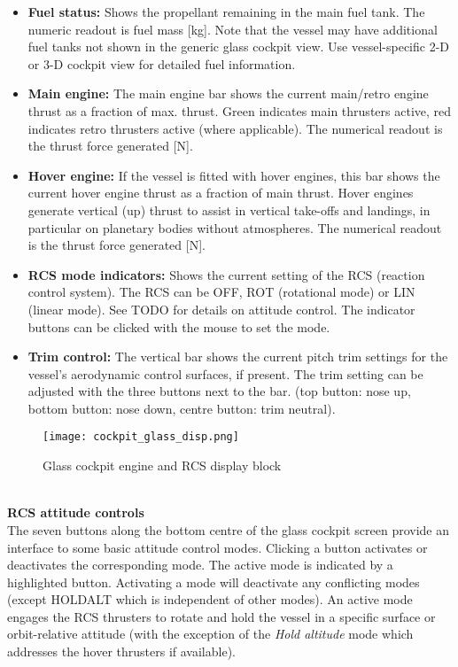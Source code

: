 \documentclass[Orbiter User Manual.tex]{subfiles}
\begin{document}
\begin{itemize}
\item \textbf{Fuel status:} Shows the propellant remaining in the main fuel tank. The numeric readout is fuel mass [kg]. Note that the vessel may have additional fuel tanks not shown in the generic glass cockpit view. Use vessel-specific 2-D or 3-D cockpit view for detailed fuel information.
\item \textbf{Main engine:} The main engine bar shows the current main/retro engine thrust as a fraction of max. thrust. Green indicates main thrusters active, red indicates retro thrusters active (where applicable). The numerical readout is the thrust force generated [N]. 
\item \textbf{Hover engine:} If the vessel is fitted with hover engines, this bar shows the current hover engine thrust as a fraction of main thrust. Hover engines generate vertical (up) thrust to assist in vertical take-offs and landings, in particular on planetary bodies without atmospheres. The numerical readout is the thrust force generated [N].
\item \textbf{RCS mode indicators:} Shows the current setting of the RCS (reaction control system). The RCS can be OFF, ROT (rotational mode) or LIN (linear mode). See TODO for details on attitude control. The indicator buttons can be clicked with the mouse to set the mode.
\item \textbf{Trim control:} The vertical bar shows the current pitch trim settings for the vessel's aerodynamic control surfaces, if present. The trim setting can be adjusted with the three buttons next to the bar. (top button: nose up, bottom button: nose down, centre button: trim neutral).

\end{itemize}


\begin{figure}[H]
  \centering
  \texttt{[image: cockpit\_glass\_disp.png]}
  \caption{Glass cockpit engine and RCS display block}
\end{figure}

\noindent
\\
\textbf{RCS attitude controls}\\
The seven buttons along the bottom centre of the glass cockpit screen provide an interface to some basic attitude control modes. Clicking a button activates or deactivates the corresponding mode. The active mode is indicated by a highlighted button. Activating a mode will deactivate any conflicting modes (except HOLDALT which is independent of other modes). An active mode engages the RCS thrusters to rotate and hold the vessel in a specific surface or orbit-relative attitude (with the exception of the \textit{Hold altitude} mode which addresses the hover thrusters if available).
\end{document}
